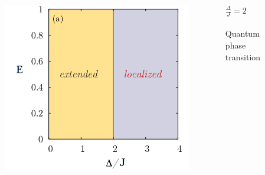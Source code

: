 \documentclass[10pt, t]{beamer}
\begin{document}
\begin{frame}
\begin{center}
\begin{columns}
\begin{center}
\begin{figure}
\includegraphics[scale=0.22]{immaginiPresentazione/duale.png}
\end{figure}
\end{center}


\begin{center}


\vspace{20pt}
\begin{large}
$\frac{\Delta}{J} = 2$\\
\downarrow \\
Quantum phase transition
\end{large}
\end{center}
\end{columns}
\end{center}

\end{frame}
\end{document}
